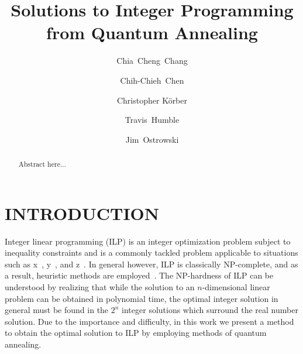 \documentclass[prd,twocolumn,tightenlines,preprintnumbers,showpacs,superscriptaddress,notitlepage,nofootinbib,eqsecnum,floatfix,longbibliography]{revtex4}
\begin{document}
\title{Solutions to Integer Programming from Quantum Annealing}

\author{Chia~Cheng~Chang}
\author{Chih-Chieh~Chen}
\author{Christopher K\"orber}
\author{Travis~Humble}
\author{Jim~Ostrowski}

\begin{abstract}
Abstract here...
\end{abstract}


\maketitle
\tableofcontents

\flushbottom
\maketitle

\section{INTRODUCTION}
\label{sec:introduction}

Integer linear programming (ILP) is an integer optimization problem subject to inequality constraints and is a commonly tackled problem applicable to situations such as x~\cite{}, y~\cite{}, and z~\cite{}. In general however, ILP is classically NP-complete, and as a result, heuristic methods are employed~\cite{}. The NP-hardness of ILP can be understood by realizing that while the solution to an $n$-dimensional linear problem can be obtained in polynomial time, the optimal integer solution in general must be found in the $2^n$ integer solutions which surround the real number solution. Due to the importance and difficulty, in this work we present a method to obtain the optimal solution to ILP by employing methods of quantum annealing.
\end{document}
